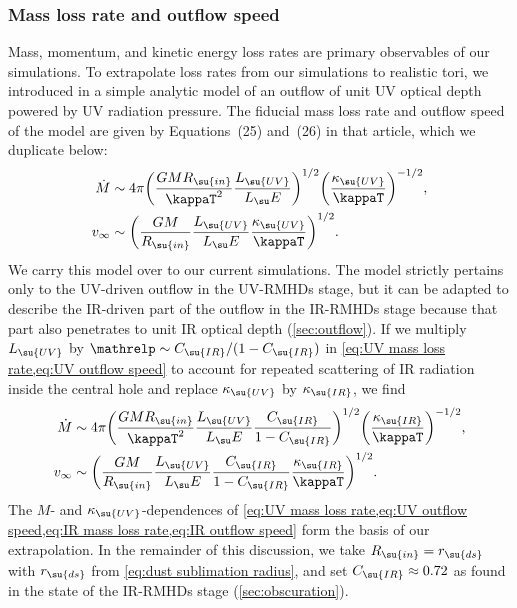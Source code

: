 \documentclass[twocolumn]{article}
\newcommand*\uvrmhd{\ac{UV}\protect\nobreakdash-\acp{RMHD}}
\newcommand*\irrmhd{\ac{IR}\protect\nobreakdash-\acp{RMHD}}
\begin{document}
\subsubsection{Mass loss rate and outflow speed}
\label{sec:realistic outflow}

Mass, momentum, and kinetic energy loss rates are primary observables of our
simulations. To extrapolate loss rates from our simulations to realistic tori,
we introduced in  a simple analytic model of an
outflow of unit \ac{UV} optical depth powered by \ac{UV} radiation pressure.
The fiducial mass loss rate and outflow speed of the model are given by
Equations~(25) and~(26) in that article, which we duplicate below:
\begin{align}
\label{eq:UV mass loss rate}
\dot M &\sim 4\pi
  \biggl(\frac{GMR_\su{in}}{\kappaT^2}\frac{L_\su{UV}}{L_\su E}\biggr)^{1/2}
  \biggl(\frac{\kappa_\su{UV}}\kappaT\biggr)^{-1/2}, \\
\label{eq:UV outflow speed}
v_\infty &\sim \biggl(\frac{GM}{R_\su{in}}\frac{L_\su{UV}}{L_\su E}
  \frac{\kappa_\su{UV}}\kappaT\biggr)^{1/2}.
\end{align}
We carry this model over to our current simulations. The model strictly
pertains only to the \ac{UV}-driven outflow in the \uvrmhd{} stage, but it can
be adapted to describe the \ac{IR}-driven part of the outflow in the \irrmhd{}
stage because that part also penetrates to unit \ac{IR} optical depth
(\cref{sec:outflow}). If we multiply $L_\su{UV}$ by $\mathrelp\sim
C_\su{IR}/(1-C_\su{IR})$ in \cref{eq:UV mass loss rate,eq:UV outflow speed} to
account for repeated scattering of \ac{IR} radiation inside the central hole
 and replace $\kappa_\su{UV}$ by
$\kappa_\su{IR}$, we find
\begin{align}
\label{eq:IR mass loss rate}
\dot M &\sim 4\pi
  \biggl(\frac{GMR_\su{in}}{\kappaT^2}\frac{L_\su{UV}}{L_\su E}
  \frac{C_\su{IR}}{1-C_\su{IR}}\biggr)^{1/2}
  \biggl(\frac{\kappa_\su{IR}}\kappaT\biggr)^{-1/2}, \\
\label{eq:IR outflow speed}
v_\infty &\sim \biggl(\frac{GM}{R_\su{in}}\frac{L_\su{UV}}{L_\su E}
  \frac{C_\su{IR}}{1-C_\su{IR}}\frac{\kappa_\su{IR}}\kappaT\biggr)^{1/2}.
\end{align}
The $M$- and $\kappa_\su{UV}$\nobreakdash-dependences of \cref{eq:UV mass loss
rate,eq:UV outflow speed,eq:IR mass loss rate,eq:IR outflow speed} form the
basis of our extrapolation. In the remainder of this discussion, we take
$R_\su{in}=r_\su{ds}$ with $r_\su{ds}$ from \cref{eq:dust sublimation radius},
and set $C_\su{IR}\approx0.72$ as found in the  state of the
\irrmhd{} stage (\cref{sec:obscuration}).
\end{document}
